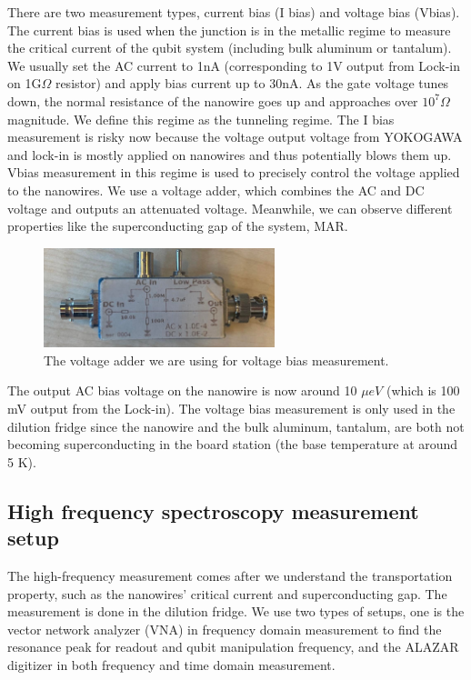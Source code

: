 There are two measurement types, current bias (I bias) and voltage bias (Vbias). The current bias is used when the junction is in the metallic regime to measure the critical current of the qubit system (including bulk aluminum or tantalum). We usually set the AC current to 1nA (corresponding to 1V output from Lock-in on 1G$\Omega$ resistor) and apply bias current up to 30nA. As the gate voltage tunes down, the normal resistance of the nanowire goes up and approaches over $10^{7}\Omega$ magnitude. We define this regime as the tunneling regime. The I bias measurement is risky now because the voltage output voltage from YOKOGAWA and lock-in is mostly applied on nanowires and thus potentially blows them up. Vbias measurement in this regime is used to precisely control the voltage applied to the nanowires. We use a voltage adder, which combines the AC and DC voltage and outputs an attenuated voltage. Meanwhile, we can observe different properties like the superconducting gap of the system, MAR. 
\begin{figure}
    \centering
    \includegraphics[width=0.6\textwidth]{Pic/Voltageadder.jpg}
    \caption{The voltage adder we are using for voltage bias measurement.}
    \label{fig:my_label}
\end{figure}
The output AC bias voltage on the nanowire is now around 10 $\mu eV$ (which is 100 mV output from the Lock-in). The voltage bias measurement is only used in the dilution fridge since the nanowire and the bulk aluminum, tantalum, are both not becoming superconducting in the board station (the base temperature at around 5 K).

\subsection{High frequency spectroscopy measurement setup}
The high-frequency measurement comes after we understand the transportation property, such as the nanowires' critical current and superconducting gap. The measurement is done in the dilution fridge. We use two types of setups, one is the vector network analyzer (VNA) in frequency domain measurement to find the resonance peak for readout and qubit manipulation frequency, and the ALAZAR digitizer in both frequency and time domain measurement.

